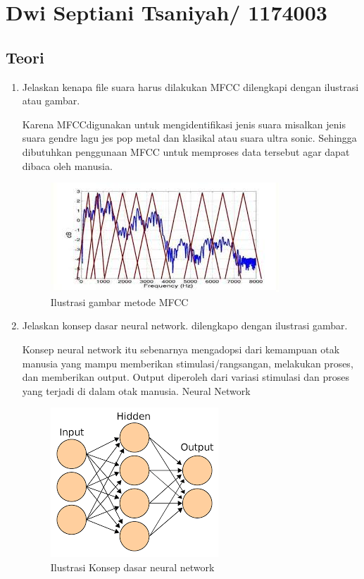 \section{Dwi Septiani Tsaniyah/ 1174003}
\subsection{Teori}

\begin{enumerate}

\item Jelaskan kenapa file suara harus dilakukan MFCC dilengkapi dengan ilustrasi atau gambar.\par
Karena MFCCdigunakan untuk mengidentifikasi jenis suara misalkan jenis suara gendre lagu jes pop metal dan klasikal atau suara ultra sonic.
Sehingga dibutuhkan penggunaan MFCC untuk memproses data tersebut agar dapat dibaca oleh manusia.

\begin{figure}[ht]
\centering
\includegraphics[scale=0.5]{figures/1174003/chapter6/1,1.jpg}
\caption{Ilustrasi gambar metode MFCC}
\label{contoh}
\end{figure}


\item Jelaskan konsep dasar neural network. dilengkapo dengan ilustrasi gambar. \par
Konsep neural network itu sebenarnya mengadopsi dari kemampuan otak manusia yang mampu memberikan stimulasi/rangsangan, 
melakukan proses, dan memberikan output. Output diperoleh dari variasi stimulasi dan proses yang terjadi di dalam otak manusia.
Neural Network 

\begin{figure}[ht]
\centering
\includegraphics[scale=0.5]{figures/1174003/chapter6/1,2.png}
\caption{Ilustrasi Konsep dasar neural network}
\label{contoh}
\end{figure}



\end{enumerate}
